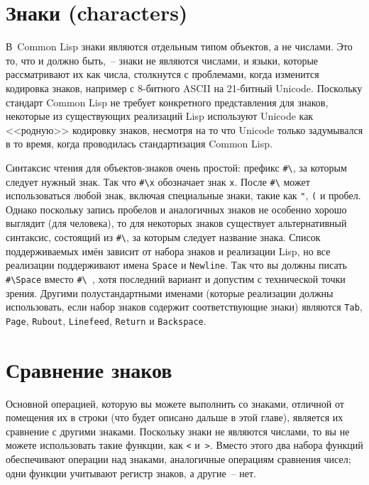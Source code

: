 \section{Знаки (characters)}

В~Common Lisp знаки являются отдельным типом объектов, а не числами.  Это то, что и должно
быть,~-- знаки не являются числами, и языки, которые рассматривают их как числа, столкнутся
с проблемами, когда изменится кодировка знаков, например с 8-битного ASCII на 21-битный
Unicode.  Поскольку стандарт Common Lisp не требует конкретного
представления для знаков, некоторые из существующих реализаций Lisp используют Unicode как
<<родную>> кодировку знаков, несмотря на то что Unicode только задумывался в то время,
когда проводилась стандартизация Common Lisp.

Синтаксис чтения для объектов-знаков очень простой: префикс \lstinline!#\!, за которым
следует нужный знак.  Так что \lstinline!#\x! обозначает знак \lstinline{x}.  После
\lstinline!#\! может использоваться любой знак, включая специальные знаки, такие как
\lstinline{"}, \lstinline{(} и пробел.  Однако поскольку запись пробелов и аналогичных знаков не
особенно хорошо выглядит (для человека), то для некоторых знаков существует альтернативный
синтаксис, состоящий из \lstinline!#\!, за которым следует название знака.  Список
поддерживаемых имён зависит от набора знаков и реализации Lisp, но все реализации
поддерживают имена \lstinline{Space} и \lstinline{Newline}.  Так что вы должны писать
\lstinline!#\Space! вместо \lstinline!#\ !, хотя последний вариант и допустим с
технической точки зрения.  Другими полустандартными именами (которые реализации должны
использовать, если набор знаков содержит соответствующие знаки) являются \lstinline{Tab},
\lstinline{Page}, \lstinline{Rubout}, \lstinline{Linefeed}, \lstinline{Return} и \lstinline{Backspace}.

\section{Сравнение знаков}

Основной операцией, которую вы можете выполнить со знаками, отличной от помещения их в
строки (что будет описано дальше в этой главе), является их сравнение с другими знаками.
Поскольку знаки не являются числами, то вы не можете использовать такие функции, как
\lstinline{<} и~\lstinline{>}.  Вместо этого два набора функций обеспечивают операции над знаками,
аналогичные операциям сравнения чисел; одни функции учитывают регистр знаков, а другие~--
нет.

